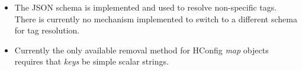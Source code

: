 
\begin{itemize}
\item The JSON schema is implemented and used to resolve non-specific tags.
  There is currently no mechanism implemented to switch to a different schema
  for tag resolution.
\item Currently the only available removal method for HConfig {\em map}
  objects requires that {\em keys} be simple scalar strings.
\end{itemize}
